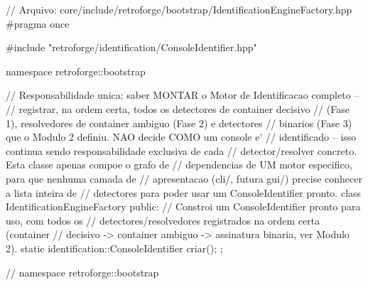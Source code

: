 \begin{CaixaCodigo}
// Arquivo: core/include/retroforge/bootstrap/IdentificationEngineFactory.hpp
#pragma once

#include "retroforge/identification/ConsoleIdentifier.hpp"

namespace retroforge::bootstrap {

// Responsabilidade unica: saber MONTAR o Motor de Identificacao completo --
// registrar, na ordem certa, todos os detectores de container decisivo
// (Fase 1), resolvedores de container ambiguo (Fase 2) e detectores
// binarios (Fase 3) que o Modulo 2 definiu. NAO decide COMO um console e'
// identificado -- isso continua sendo responsabilidade exclusiva de cada
// detector/resolver concreto. Esta classe apenas compoe o grafo de
// dependencias de UM motor especifico, para que nenhuma camada de
// apresentacao (cli/, futura gui/) precise conhecer a lista inteira de
// detectores para poder usar um ConsoleIdentifier pronto.
class IdentificationEngineFactory {
public:
    // Constroi um ConsoleIdentifier pronto para uso, com todos os
    // detectores/resolvedores registrados na ordem certa (container
    // decisivo -> container ambiguo -> assinatura binaria, ver Modulo 2).
    static identification::ConsoleIdentifier criar();
};

} // namespace retroforge::bootstrap
\end{CaixaCodigo}

